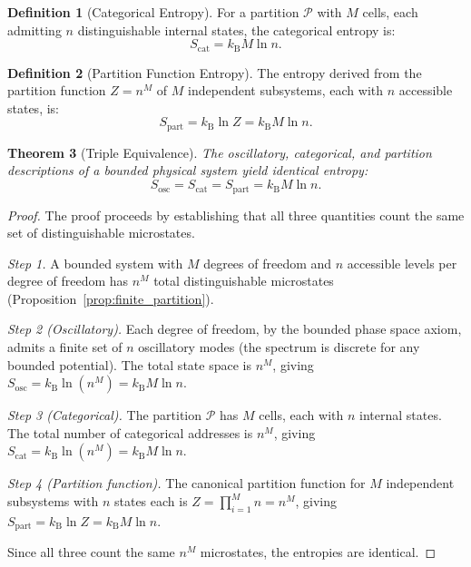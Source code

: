 \documentclass[twocolumn,10pt]{article}
\newtheorem{theorem}{Theorem}[section]
\theoremstyle{definition}
\newtheorem{definition}[theorem]{Definition}
\theoremstyle{remark}
\newcommand{\Sosc}{S_{\mathrm{osc}}}
\newcommand{\Scat}{S_{\mathrm{cat}}}
\newcommand{\Spart}{S_{\mathrm{part}}}
\newcommand{\kB}{k_{\mathrm{B}}}
\begin{document}
\begin{definition}[Categorical Entropy]
\label{def:cat_entropy}
For a partition $\mathcal{P}$ with $M$ cells, each admitting $n$ distinguishable internal states, the categorical entropy is:
\begin{equation}
  \Scat = \kB M \ln n.
  \label{eq:scat}
\end{equation}
\end{definition}

\begin{definition}[Partition Function Entropy]
\label{def:part_entropy}
The entropy derived from the partition function $Z = n^M$ of $M$ independent subsystems, each with $n$ accessible states, is:
\begin{equation}
  \Spart = \kB \ln Z = \kB M \ln n.
  \label{eq:spart}
\end{equation}
\end{definition}

\begin{theorem}[Triple Equivalence]
\label{thm:triple_equiv}
The oscillatory, categorical, and partition descriptions of a bounded physical system yield identical entropy:
\begin{equation}
  \Sosc = \Scat = \Spart = \kB M \ln n.
  \label{eq:triple_equiv}
\end{equation}
\end{theorem}

\begin{proof}
The proof proceeds by establishing that all three quantities count the same set of distinguishable microstates.

\emph{Step 1.} A bounded system with $M$ degrees of freedom and $n$ accessible levels per degree of freedom has $n^M$ total distinguishable microstates (Proposition~\ref{prop:finite_partition}).

\emph{Step 2 (Oscillatory).} Each degree of freedom, by the bounded phase space axiom, admits a finite set of $n$ oscillatory modes (the spectrum is discrete for any bounded potential). The total state space is $n^M$, giving $\Sosc = \kB \ln(n^M) = \kB M \ln n$.

\emph{Step 3 (Categorical).} The partition $\mathcal{P}$ has $M$ cells, each with $n$ internal states. The total number of categorical addresses is $n^M$, giving $\Scat = \kB \ln(n^M) = \kB M \ln n$.

\emph{Step 4 (Partition function).} The canonical partition function for $M$ independent subsystems with $n$ states each is $Z = \prod_{i=1}^M n = n^M$, giving $\Spart = \kB \ln Z = \kB M \ln n$.

Since all three count the same $n^M$ microstates, the entropies are identical.
\end{proof}
\end{document}
